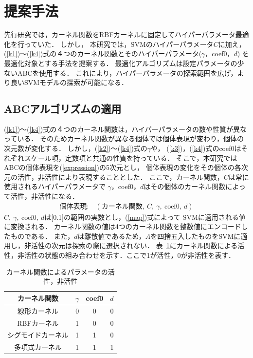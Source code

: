 \section{提案手法}
先行研究では，カーネル関数をRBFカーネルに固定してハイパーパラメータ最適化を行っていた．
しかし，
本研究では，SVMのハイパーパラメータ$C$に加え，
(\ref{k1})〜(\ref{k4})式の４つのカーネル関数とそのハイパーパラメータ($\gamma$，coef0，$d$)
を最適化対象とする手法を提案する．
最適化アルゴリズムは設定パラメータの少ないABCを使用する．
これにより，ハイパーパラメータの探索範囲を広げ，より良いSVMモデルの探索が可能になる．
\subsection{ABCアルゴリズムの適用}
(\ref{k1})〜(\ref{k4})式の４つのカーネル関数は，ハイパーパラメータの数や性質が異なっている．
そのためカーネル関数が異なる個体では個体表現が変わり，個体の次元数が変化する．
しかし，(\ref{k2})〜(\ref{k4})式の$\gamma$や，
(\ref{k3})，(\ref{k4})式のcoef0はそれぞれスケール項，定数項と共通の性質を持っている．
そこで，本研究ではABCの個体表現を(\ref{expression})の5次元とし，
個体表現の変化をその個体の各次元の活性，非活性により表現することとした．
ここで，カーネル関数，$C$は常に使用されるハイパーパラメータで
$\gamma$，coef0，$d$はその個体のカーネル関数によって活性，非活性になる．
\begin{align}
    \text{個体表現:} \quad  (\text{カーネル関数},~C,~\gamma,~\text{coef0},~d)\label{expression}
\end{align}
$C,~\gamma,~\text{coef0},~d$は[0.1]の範囲の実数とし，(\ref{map})式によって
SVMに適用される値に変換される．
カーネル関数の値は4つのカーネル関数を整数値にエンコードしたものである．
また，$d$は離散値であるため，$A$を四捨五入したものをSVMに適用し，非活性の次元は探索の際に選択されない．
表~\ref{tab:param}にカーネル関数による活性，非活性の状態の組み合わせを示す．ここで1が活性，0が非活性を表す．
\begin{table}[t]
    \centering
    \caption{カーネル関数によるパラメータの活性，非活性}  %
    \begin{tabular}{|c|c|c|c|}  %
        \hline  %
        カーネル関数 & $\gamma$ & coef0 & $d$\\  %
        \hline  %
        線形カーネル& 0& 0& 0\\  %
        \hline  %
        RBFカーネル & 1 & 0& 0\\  %
        \hline  %
        シグモイドカーネル & 1 & 1& 0\\  %
        \hline  %
        多項式カーネル & 1 & 1& 1\\  %
        \hline  %
    \end{tabular}
    
    \label{tab:param}  %
  \end{table} %
  
